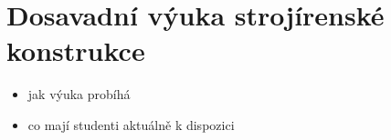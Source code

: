 \chapter{Dosavadní výuka strojírenské konstrukce}
\noindent {}
\begin{itemize}[topsep=0pt]
    \setlength\itemsep{0.05em}
    \item jak výuka probíhá
    \item co mají studenti aktuálně k dispozici
\end{itemize}